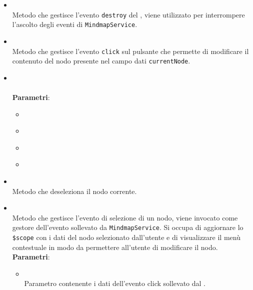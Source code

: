 \begin{itemize}
\begin{itemize}
\begin{itemize}
\end{itemize}
\item {}
\\ Metodo che gestisce l'evento \texttt{destroy} del , viene utilizzato per interrompere l'ascolto degli eventi di \texttt{MindmapService}.
\item {}
\\ Metodo che gestisce l'evento \texttt{click} sul pulsante che permette di modificare il contenuto del nodo presente nel campo dati \texttt{currentNode}.
\item {}
\\ \dpConstructor
\\ \textbf{Parametri}:
\begin{itemize}
\item {}
\\ \dpScopeParam
\item {}
\\ \dpMDDialogServiceParam
\item {}
\\ \dpNodeServiceParam
\item {}
\\ \dpProjectServiceParam
\end{itemize}
\item {}
\\ Metodo che deseleziona il nodo corrente.
\item {}
\\ Metodo che gestisce l'evento di selezione di un nodo, viene invocato come gestore dell'evento sollevato da \texttt{MindmapService}. Si occupa di aggiornare lo \texttt{\$scope} con i dati del nodo selezionato dall'utente e di visualizzare il menù contestuale in modo da permettere all'utente di modificare il nodo.
\\ \textbf{Parametri}:
\begin{itemize}
\item {}
\\ Parametro contenente i dati dell'evento click sollevato dal .

\end{itemize}
\end{itemize}
\end{itemize}
